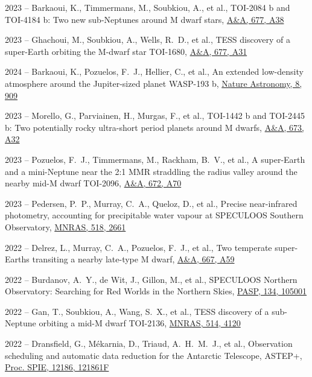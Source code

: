 \documentclass[10pt,letterpaper]{article}
\newcommand{\publi}[4]{\item #1 -- #3, #2, #4}
\newcommand{\mnras}{MNRAS}
\newcommand{\aap}{A\&A}
\newcommand{\procspie}{Proc. SPIE}
\newcommand{\pasp}{PASP}
\begin{document}
\begin{etaremune}
    \publi{2023}{TOI-2084 b and TOI-4184 b: Two new sub-Neptunes around M dwarf stars}
    {Barkaoui, K., Timmermans, M., Soubkiou, A., et al.}
    {\href{https://ui.adsabs.harvard.edu/abs/2023A\&A...677A..38B}{\aap, 677, A38}}
    
    \publi{2023}{TESS discovery of a super-Earth orbiting the M-dwarf star TOI-1680}
    {Ghachoui, M., Soubkiou, A., Wells, R.~D., et al.}
    {\href{https://ui.adsabs.harvard.edu/abs/2023A\&A...677A..31G}{\aap, 677, A31}}
    
    \publi{2024}{An extended low-density atmosphere around the Jupiter-sized planet WASP-193 b}
    {Barkaoui, K., Pozuelos, F.~J., Hellier, C., et al.}
    {\href{https://ui.adsabs.harvard.edu/abs/2024NatAs...8..909B}{Nature Astronomy, 8, 909}}
        
    \publi{2023}{TOI-1442 b and TOI-2445 b: Two potentially rocky ultra-short period planets around M dwarfs}
    {Morello, G., Parviainen, H., Murgas, F., et al.}
    {\href{https://ui.adsabs.harvard.edu/abs/2023A\&A...673A..32M}{\aap, 673, A32}}
    
    \publi{2023}{A super-Earth and a mini-Neptune near the 2:1 MMR straddling the radius valley around the nearby mid-M dwarf TOI-2096}
    {Pozuelos, F.~J., Timmermans, M., Rackham, B.~V., et al.}
    {\href{https://ui.adsabs.harvard.edu/abs/2023A\&A...672A..70P}{\aap, 672, A70}}
    
    \publi{2023}{Precise near-infrared photometry, accounting for precipitable water vapour at SPECULOOS Southern Observatory}
    {Pedersen, P.~P., Murray, C.~A., Queloz, D., et al.}
    {\href{https://ui.adsabs.harvard.edu/abs/2023MNRAS.518.2661P}{\mnras, 518, 2661}}
    
    \publi{2022}{Two temperate super-Earths transiting a nearby late-type M dwarf}
    {Delrez, L., Murray, C.~A., Pozuelos, F.~J., et al.}
    {\href{https://ui.adsabs.harvard.edu/abs/2022A\&A...667A..59D}{\aap, 667, A59}}
    
    \publi{2022}{SPECULOOS Northern Observatory: Searching for Red Worlds in the Northern Skies}
    {Burdanov, A.~Y., de Wit, J., Gillon, M., et al.}
    {\href{https://ui.adsabs.harvard.edu/abs/2022PASP..134j5001B}{\pasp, 134, 105001}}
    
    \publi{2022}{TESS discovery of a sub-Neptune orbiting a mid-M dwarf TOI-2136}
    {Gan, T., Soubkiou, A., Wang, S.~X., et al.}
    {\href{https://ui.adsabs.harvard.edu/abs/2022MNRAS.514.4120G}{\mnras, 514, 4120}}
    
    \publi{2022}{Observation scheduling and automatic data reduction for the Antarctic Telescope, ASTEP+}
    {Dransfield, G., M{\'e}karnia, D., Triaud, A.~H.~M.~J., et al.}
    {\href{https://ui.adsabs.harvard.edu/abs/2022SPIE12186E..1FD}{\procspie, 12186, 121861F}}
    

\end{etaremune}
\end{document}
